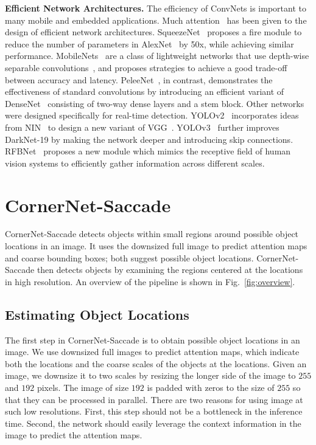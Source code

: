 \documentclass{bmvc2k}
\begin{document}
\smallskip \noindent \textbf{Efficient Network Architectures.} The efficiency of ConvNets is important to many mobile and embedded applications. Much attention~\cite{li2016pruning,rastegari2016xnor,zhang2018shufflenet,ma2018shufflenet,laube2018shufflenasnets,hu2018squeeze,sandler2018mobilenetv2} has been given to the design of efficient network architectures. SqueezeNet~\cite{iandola2016squeezenet} proposes a fire module to reduce the number of parameters in AlexNet~\cite{krizhevsky2012imagenet} by 50x, while achieving similar performance.  MobileNets~\cite{howard2017mobilenets} are a class of lightweight networks that use depth-wise separable convolutions~\cite{chollet2017xception}, and proposes strategies to achieve a good trade-off between accuracy and latency. PeleeNet~\cite{wang2018pelee}, in contrast, demonstrates the effectiveness of standard convolutions by introducing an efficient variant of DenseNet~\cite{huang2017densely} consisting of two-way dense layers and a stem block. Other networks were designed specifically for real-time detection. YOLOv2~\cite{redmon2017yolo9000} incorporates ideas from NIN~\cite{lin2013network} to design a new variant of VGG~\cite{simonyan2014very}. YOLOv3~\cite{redmon2018yolov3} further improves DarkNet-19 by making the network deeper and introducing skip connections. RFBNet~\cite{liu2018receptive} proposes a new module which mimics the receptive field of human vision systems to efficiently gather information across different scales.

\section{CornerNet-Saccade}
CornerNet-Saccade detects objects within small regions around possible object locations in an image. It uses the downsized full image to predict attention maps and coarse bounding boxes; both suggest possible object locations. CornerNet-Saccade then detects objects by examining the regions centered at the locations in high resolution. An overview of the pipeline is shown in Fig.~\ref{fig:overview}. 

\subsection{Estimating Object Locations}
The first step in CornerNet-Saccade is to obtain possible object locations in an image. We use downsized full images to predict attention maps, which indicate both the locations and the coarse scales of the objects at the locations. Given an image, we downsize it to two scales by resizing the longer side of the image to $255$ and $192$ pixels. The image of size $192$ is padded with zeros to the size of $255$ so that they can be processed in parallel. There are two reasons for using image at such low resolutions. First, this step should not be a bottleneck in the inference time. Second, the network should easily leverage the context information in the image to predict the attention maps.
\end{document}

